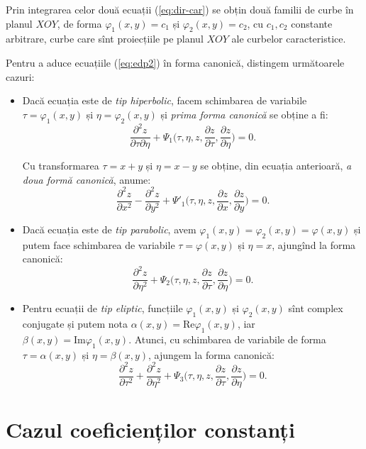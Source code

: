 \documentclass[11pt,a4paper]{article}
\theoremstyle{dotless}
\theoremstyle{dotlessdr}
\begin{document}
Prin integrarea celor două ecuații (\ref{eq:dir-car}) se obțin două familii de
curbe în planul $ XOY $, de forma $ \varphi_1(x, y) = c_1 $ și $ \varphi_2(x, y) = c_2 $,
cu $ c_1, c_2 $ constante arbitrare, curbe care sînt proiecțiile pe planul $ XOY $ ale
curbelor caracteristice.

Pentru a aduce ecuațiile (\ref{eq:edp2}) în forma canonică, distingem
următoarele cazuri:
\begin{itemize}
\item Dacă ecuația este de \emph{tip hiperbolic}, facem schimbarea de variabile
  $ \tau = \varphi_1(x, y) $ și $ \eta = \varphi_2(x, y) $ și \emph{prima forma canonică} se
  obține a fi:
  \[
    \frac{\partial^2 z}{\partial \tau \partial \eta} + %
    \Psi_1\Big( \tau, \eta, z, \frac{\partial z}{\partial \tau}, \frac{\partial z}{\partial \eta} \Big) = 0.
  \]

  Cu transformarea $ \tau = x + y $ și $ \eta = x - y $ se obține, din ecuația anterioară,
  \emph{a doua formă canonică}, anume:
  \[
    \frac{\partial^2 z}{\partial x^2} - \frac{\partial^2 z}{\partial y^2} + %
    \Psi'_1 \Big( \tau, \eta, z, \frac{\partial z}{\partial x}, \frac{\partial z}{\partial y} \Big) = 0.
  \]
\item Dacă ecuația este de \emph{tip parabolic}, avem
  $ \varphi_1(x, y) = \varphi_2(x, y) = \varphi(x, y) $ și putem face schimbarea de
  variabile $ \tau = \varphi(x, y) $ și $ \eta = x $, ajungînd la forma canonică:
  \[
    \frac{\partial^2 z}{\partial \eta^2} + %
    \Psi_2\Big( \tau, \eta, z, \frac{\partial z}{\partial \tau}, \frac{\partial z}{\partial \eta} \Big) = 0.
  \]
\item Pentru ecuații de \emph{tip eliptic}, funcțiile $ \varphi_1(x, y) $ și $ \varphi_2(x, y) $
  sînt complex conjugate și putem nota $ \alpha(x, y) = \mathrm{Re} \varphi_1(x, y) $, iar
  $ \beta(x, y) = \mathrm{Im} \varphi_1(x, y) $. Atunci, cu schimbarea de variabile de forma
  $ \tau = \alpha(x, y) $ și $ \eta = \beta(x, y) $, ajungem la forma canonică:
  \[
    \frac{\partial^2 z}{\partial \tau^2} + \frac{\partial^2 z}{\partial \eta^2} + %
    \Psi_3 \Big( \tau, \eta, z, \frac{\partial z}{\partial \tau}, \frac{\partial z}{\partial \eta} \Big) = 0.
  \]
\end{itemize}


\section{Cazul coeficienților constanți}
\end{document}
